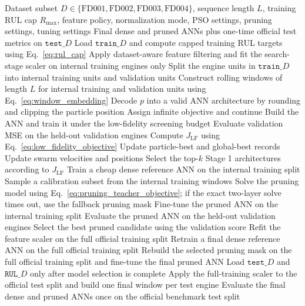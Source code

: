 \begin{algorithm}[H]
\caption{PSO screening, MILP-guided pruning, and final evaluation for C-MAPSS RUL prediction}
\label{alg:two_stage_ann_pso}
\begin{algorithmic}[1]
\Require Dataset subset $D \in \{\mathrm{FD001},\mathrm{FD002},\mathrm{FD003},\mathrm{FD004}\}$, sequence length $L$, training RUL cap $R_{\max}$, feature policy, normalization mode, PSO settings, pruning settings, tuning settings
\Ensure Final dense and pruned ANNs plus one-time official test metrics on $\texttt{test\_}D$
\State Load $\texttt{train\_}D$ and compute capped training RUL targets using Eq.~\eqref{eq:rul_cap}
\State Apply dataset-aware feature filtering and fit the search-stage scaler on internal training engines only
\State Split the engine units in $\texttt{train\_}D$ into internal training units and validation units
\State Construct rolling windows of length $L$ for internal training and validation units using Eq.~\eqref{eq:window_embedding}
        \State Decode $p$ into a valid ANN architecture by rounding and clipping the particle position
            \State Assign infinite objective and continue
        \EndIf
        \State Build the ANN and train it under the low-fidelity screening budget
        \State Evaluate validation MSE on the held-out validation engines
        \State Compute $J_{\mathrm{LF}}$ using Eq.~\eqref{eq:low_fidelity_objective}
        \State Update particle-best and global-best records
    \EndFor
    \State Update swarm velocities and positions
\EndFor
\State Select the top-$k$ Stage 1 architectures according to $J_{\mathrm{LF}}$
    \State Train a cheap dense reference ANN on the internal training split
    \State Sample a calibration subset from the internal training windows
    \State Solve the pruning model using Eq.~\eqref{eq:pruning_teacher_objective}; if the exact two-layer solve times out, use the fallback pruning mask
    \State Fine-tune the pruned ANN on the internal training split
    \State Evaluate the pruned ANN on the held-out validation engines
\EndFor
\State Select the best pruned candidate using the validation score
\State Refit the feature scaler on the full official training split
\State Retrain a final dense reference ANN on the full official training split
\State Rebuild the selected pruning mask on the full official training split and fine-tune the final pruned ANN
\State Load $\texttt{test\_}D$ and $\texttt{RUL\_}D$ only after model selection is complete
\State Apply the full-training scaler to the official test split and build one final window per test engine
\State Evaluate the final dense and pruned ANNs once on the official benchmark test split
\end{algorithmic}
\end{algorithm}
